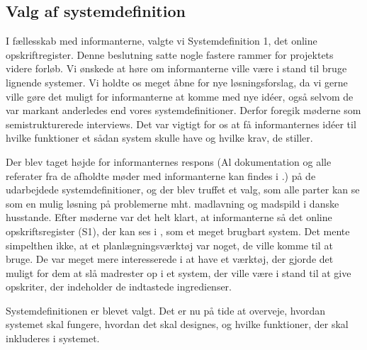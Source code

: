 \subsection{Valg af systemdefinition}
\label{subsec:valgafsystemdefinition}

I fællesskab med informanterne, valgte vi Systemdefinition 1, det online opskriftregister. Denne beslutning satte nogle fastere rammer for projektets videre forløb. Vi ønskede at høre om informanterne ville være i stand til bruge lignende systemer. Vi holdte os meget åbne for nye løsningsforslag, da vi gerne ville gøre det muligt for informanterne at komme med nye idéer, også selvom de var markant anderledes end vores systemdefinitioner. Derfor foregik møderne som semistrukturerede interviews. Det var vigtigt for os at få informanternes idéer til hvilke funktioner et sådan system skulle have og hvilke krav, de stiller.

Der blev taget højde for informanternes respons (Al dokumentation og alle referater fra de afholdte møder med informanterne kan findes i .) på de udarbejdede systemdefinitioner, og der blev truffet et valg, som alle parter kan se som en mulig løsning på problemerne mht. madlavning og madspild i danske husstande. Efter møderne var det helt klart, at informanterne så det online opskriftsregister (S1), der kan ses i , som et meget brugbart system. Det mente simpelthen ikke, at et planlægningsværktøj var noget, de ville komme til at bruge. De var meget mere interesserede i at have et værktøj, der gjorde det muligt for dem at slå madrester op i et system, der ville være i stand til at give opskriter, der indeholder de indtastede ingredienser.

Systemdefinitionen er blevet valgt. Det er nu på tide at overveje, hvordan systemet skal fungere, hvordan det skal designes, og hvilke funktioner, der skal inkluderes i systemet.
